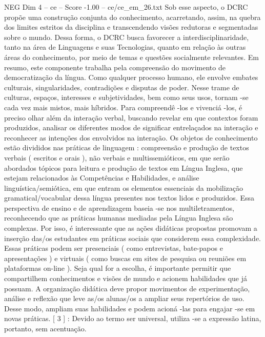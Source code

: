 \begin{textsample}{NEG Dim 4 – ce – Score -1.00 – ce/ce\_em\_26.txt}
Sob esse aspecto, o DCRC propõe uma construção conjunta do conhecimento, acarretando, assim, na quebra dos limites estritos da disciplina e transcendendo visões redutoras e segmentadas sobre o mundo.
Dessa forma, o DCRC busca favorecer a interdisciplinaridade, tanto na área de Linguagens e suas Tecnologias, quanto em relação às outras áreas do conhecimento, por meio de temas e questões socialmente relevantes.
Em resumo, este componente trabalha pela compreensão do movimento de democratização da língua.
Como qualquer processo humano, ele envolve embates culturais, singularidades, contradições e disputas de poder.
Nesse trame de culturas, espaços, interesses e subjetividades, bem como seus usos, tornam -se cada vez mais mistos, mais híbridos.
Para compreendê -los e vivenciá -los, é preciso olhar além da interação verbal, buscando revelar em que contextos foram produzidos, analisar os diferentes modos de significar entrelaçados na interação e reconhecer as intenções dos envolvidos na interação.
Os objetos de conhecimento estão divididos nas práticas de linguagem : compreensão e produção de textos verbais ( escritos e orais ), não verbais e multissemióticos, em que serão abordados tópicos para leitura e produção de textos em Língua Inglesa, que estejam relacionados às Competências e Habilidades, e análise linguística/semiótica, em que entram os elementos essenciais da mobilização gramatical/vocabular dessa língua presentes nos textos lidos e produzidos.
Essa perspectiva de ensino e de aprendizagem baseia -se nos multiletramentos, reconhecendo que as práticas humanas mediadas pela Língua Inglesa são complexas.
Por isso, é interessante que as ações didáticas propostas promovam a inserção das/os estudantes em práticas sociais que considerem essa complexidade.
Essas práticas podem ser presenciais ( como entrevistas, bate-papos e apresentações ) e virtuais ( como buscas em sites de pesquisa ou reuniões em plataformas on-line ).
Seja qual for a escolha, é importante permitir que compartilhem conhecimentos e visões de mundo e acionem habilidades que já possuam.
A organização didática deve propor movimentos de experimentação, análise e reflexão que leve as/os alunas/os a ampliar seus repertórios de uso.
Desse modo, ampliam suas habilidades e podem acioná -las para engajar -se em novas práticas. [ 3 ] : Devido ao termo ser universal, utiliza -se a expressão latina, portanto, sem acentuação.

\end{textsample}
